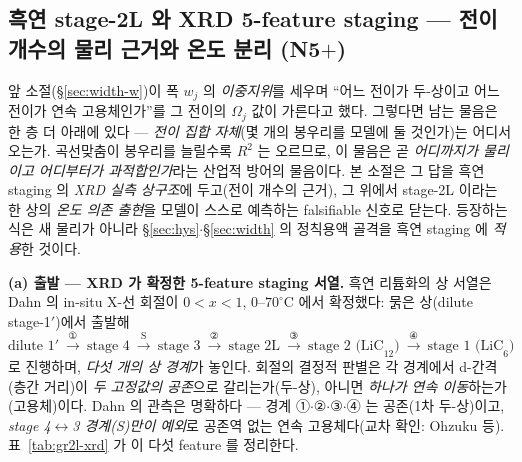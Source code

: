 \subsection{흑연 stage-2L 와 XRD 5-feature staging --- 전이 개수의 물리 근거와 온도 분리 (N5$+$)}\label{ssec:gr-2L}
앞 소절(\S\ref{sec:width-w})이 폭 $w_j$ 의 \emph{이중지위}를 세우며 ``어느 전이가 두-상이고 어느 전이가 연속
고용체인가''를 그 전이의 $\Omega_j$ 값이 가른다고 했다. 그렇다면 남는 물음은 한 층 더 아래에 있다 --- \emph{전이 집합
자체}(몇 개의 봉우리를 모델에 둘 것인가)는 어디서 오는가. 곡선맞춤이 봉우리를 늘릴수록 $R^2$ 는 오르므로, 이 물음은
곧 \emph{어디까지가 물리이고 어디부터가 과적합인가}라는 산업적 방어의 물음이다. 본 소절은 그 답을 흑연 staging 의
\emph{XRD 실측 상구조}에 두고(전이 개수의 근거), 그 위에서 stage-2L 이라는 한 상의 \emph{온도 의존 출현}을 모델이
스스로 예측하는 falsifiable 신호로 닫는다. 등장하는 식은 새 물리가 아니라 \S\ref{sec:hys}$\cdot$\S\ref{sec:width} 의
정칙용액 골격을 흑연 staging 에 \emph{적용}한 것이다.

\textbf{(a) 출발 --- XRD 가 확정한 5-feature staging 서열.} 흑연 리튬화의 상 서열은 Dahn 의 in-situ X-선 회절이
$0<x<1$, $0$--$70^\circ$C 에서 확정했다\cite{dahn1991}: 묽은 상(dilute stage-1$'$)에서 출발해
\begin{equation}
\text{dilute 1}'\ \xrightarrow{\ \text{①}\ }\ \text{stage 4}\ \xrightarrow{\ \text{S}\ }\ \text{stage 3}
\ \xrightarrow{\ \text{②}\ }\ \text{stage 2L}\ \xrightarrow{\ \text{③}\ }\ \text{stage 2 (LiC}_{12})
\ \xrightarrow{\ \text{④}\ }\ \text{stage 1 (LiC}_6)
\label{eq:gr2l-sequence}
\end{equation}
로 진행하며, \emph{다섯 개의 상 경계}가 놓인다. 회절의 결정적 판별은 각 경계에서 d-간격(층간 거리)이 \emph{두
고정값의 공존}으로 갈리는가(두-상), 아니면 \emph{하나가 연속 이동}하는가(고용체)이다. Dahn 의 관측은 명확하다 ---
경계 ①$\cdot$②$\cdot$③$\cdot$④ 는 공존(1차 두-상)이고, \emph{stage 4$\leftrightarrow$3 경계(S)만이 예외}로 공존역
없는 연속 고용체다(교차 확인: Ohzuku 등\cite{ohzuku1993}). 표~\ref{tab:gr2l-xrd} 가 이 다섯 feature 를 정리한다.

